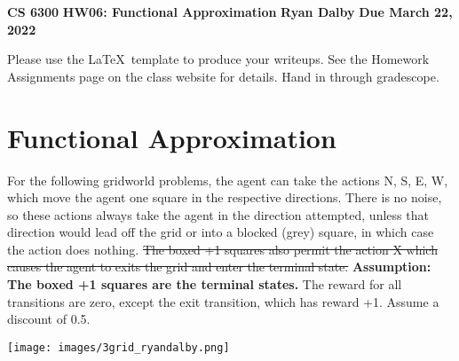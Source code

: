 \documentclass[12pt]{article}
\begin{document}
\begin{center} 
{\bf CS 6300} \hfill {\large\bf HW06: Functional Approximation} \hfill {\bf Ryan Dalby} \hfill {\bf Due March 22, 2022}
\end{center}

\noindent
Please use the \LaTeX\ template to produce your writeups. See the
Homework Assignments page on the class website for details.  Hand in
through gradescope.

\section{Functional Approximation}

For the following gridworld problems, the agent can take the actions
N, S, E, W, which move the agent one square in the respective
directions. There is no noise, so these actions always take the agent
in the direction attempted, unless that direction would lead off the
grid or into a blocked (grey) square, in which case the action does
nothing. \st{The boxed +1 squares also permit the action X which causes
the agent to exits the grid and enter the terminal state.} \textbf{Assumption: The boxed +1 squares are the terminal states.} The reward
for all transitions are zero, except the exit transition, which has
reward +1. Assume a discount of 0.5.

\begin{center}
\texttt{[image: images/3grid\_ryandalby.png]}
\end{center}
\end{document}
